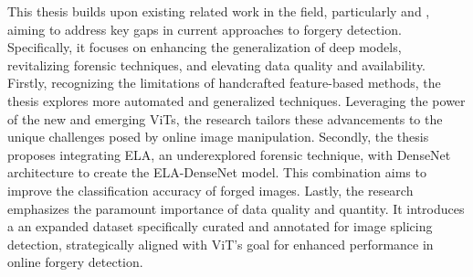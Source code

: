 This thesis builds upon existing related work in the field, particularly \cite{ma2023imlvit} and \cite{zhang2021image}, aiming to address key gaps in current approaches to forgery detection. Specifically, it focuses on enhancing the generalization of deep models, revitalizing forensic techniques, and elevating data quality and availability. Firstly, recognizing the limitations of handcrafted feature-based methods, the thesis explores more automated and generalized techniques. Leveraging the power of the new and emerging ViTs, the research tailors these advancements to the unique challenges posed by online image manipulation. Secondly, the thesis proposes integrating ELA, an underexplored forensic technique, with DenseNet architecture to create the ELA-DenseNet model. This combination aims to improve the classification accuracy of forged images. Lastly, the research emphasizes the paramount importance of data quality and quantity. It introduces a an expanded dataset specifically curated and annotated for image splicing detection, strategically aligned with ViT's goal for enhanced performance in online forgery detection.


